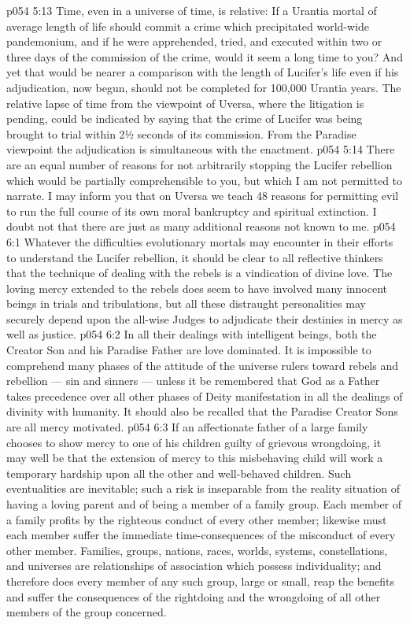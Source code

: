 \vs p054 5:13 \bibnobreakspace Time, even in a universe of time, is relative: If a Urantia mortal of average length of life should commit a crime which precipitated world\hyp{}wide pandemonium, and if he were apprehended, tried, and executed within two or three days of the commission of the crime, would it seem a long time to you? And yet that would be nearer a comparison with the length of Lucifer’s life even if his adjudication, now begun, should not be completed for 100,000 Urantia years. The relative lapse of time from the viewpoint of Uversa, where the litigation is pending, could be indicated by saying that the crime of Lucifer was being brought to trial within 2½ seconds of its commission. From the Paradise viewpoint the adjudication is simultaneous with the enactment.
\vs p054 5:14 \pc There are an equal number of reasons for not arbitrarily stopping the Lucifer rebellion which would be partially comprehensible to you, but which I am not permitted to narrate. I may inform you that on Uversa we teach 48 reasons for permitting evil to run the full course of its own moral bankruptcy and spiritual extinction. I doubt not that there are just as many additional reasons not known to me.
\vs p054 6:1 Whatever the difficulties evolutionary mortals may encounter in their efforts to understand the Lucifer rebellion, it should be clear to all reflective thinkers that the technique of dealing with the rebels is a vindication of divine love. The loving mercy extended to the rebels does seem to have involved many innocent beings in trials and tribulations, but all these distraught personalities may securely depend upon the all\hyp{}wise Judges to adjudicate their destinies in mercy as well as justice.
\vs p054 6:2 In all their dealings with intelligent beings, both the Creator Son and his Paradise Father are love dominated. It is impossible to comprehend many phases of the attitude of the universe rulers toward rebels and rebellion --- sin and sinners --- unless it be remembered that God as a Father takes precedence over all other phases of Deity manifestation in all the dealings of divinity with humanity. It should also be recalled that the Paradise Creator Sons are all mercy motivated.
\vs p054 6:3 \pc If an affectionate father of a large family chooses to show mercy to one of his children guilty of grievous wrongdoing, it may well be that the extension of mercy to this misbehaving child will work a temporary hardship upon all the other and well\hyp{}behaved children. Such eventualities are inevitable; such a risk is inseparable from the reality situation of having a loving parent and of being a member of a family group. Each member of a family profits by the righteous conduct of every other member; likewise must each member suffer the immediate time\hyp{}consequences of the misconduct of every other member. Families, groups, nations, races, worlds, systems, constellations, and universes are relationships of association which possess individuality; and therefore does every member of any such group, large or small, reap the benefits and suffer the consequences of the rightdoing and the wrongdoing of all other members of the group concerned.
